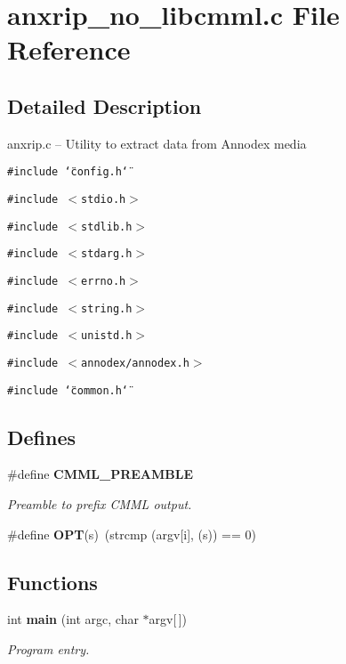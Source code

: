 \section{anxrip\_\-no\_\-libcmml.c File Reference}
\label{anxrip__no__libcmml_8c}


\subsection{Detailed Description}
anxrip.c -- Utility to extract data from Annodex media 



{\tt \#include \char`\"{}config.h\char`\"{}}\par
{\tt \#include $<$stdio.h$>$}\par
{\tt \#include $<$stdlib.h$>$}\par
{\tt \#include $<$stdarg.h$>$}\par
{\tt \#include $<$errno.h$>$}\par
{\tt \#include $<$string.h$>$}\par
{\tt \#include $<$unistd.h$>$}\par
{\tt \#include $<$annodex/annodex.h$>$}\par
{\tt \#include \char`\"{}common.h\char`\"{}}\par
\subsection*{Defines}
\begin{CompactItemize}
\item 
\#define {\bf CMML\_\-PREAMBLE}
\begin{CompactList}\small\item\em Preamble to prefix CMML output. \item\end{CompactList}\item 
\#define {\bf OPT}(s)\ (strcmp (argv[i], (s)) == 0)\label{anxrip__no__libcmml_8c_a1}

\end{CompactItemize}
\subsection*{Functions}
\begin{CompactItemize}
\item 
int {\bf main} (int argc, char $\ast$argv[$\,$])\label{anxrip__no__libcmml_8c_a11}

\begin{CompactList}\small\item\em Program entry. \item\end{CompactList}\end{CompactItemize}


